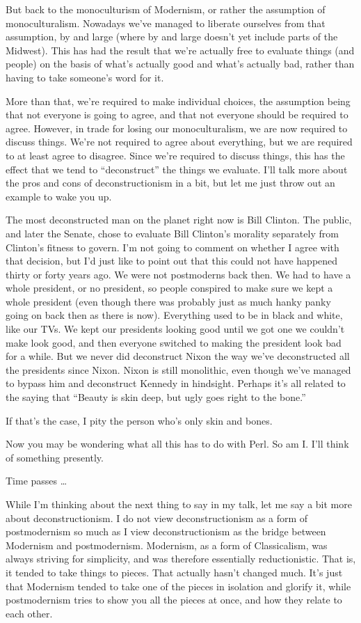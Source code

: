\documentclass[10pt,letterpaper]{article}
\begin{document}
But back to the monoculturism of Modernism, or rather the assumption of
monoculturalism. Nowadays we've managed to liberate ourselves from that
assumption, by and large (where by and large doesn't yet include parts of the
Midwest). This has had the result that we're actually free to evaluate things
(and people) on the basis of what's actually good and what's actually bad,
rather than having to take someone's word for it.

More than that, we're required to make individual choices, the assumption
being that not everyone is going to agree, and that not everyone should be
required to agree. However, in trade for losing our monoculturalism, we are
now required to discuss things. We're not required to agree about everything,
but we are required to at least agree to disagree. Since we're required to
discuss things, this has the effect that we tend to ``deconstruct'' the
things we evaluate. I'll talk more about the pros and cons of
deconstructionism in a bit, but let me just throw out an example to wake you
up.

The most deconstructed man on the planet right now is Bill Clinton. The
public, and later the Senate, chose to evaluate Bill Clinton's morality
separately from Clinton's fitness to govern. I'm not going to comment on
whether I agree with that decision, but I'd just like to point out that this
could not have happened thirty or forty years ago. We were not postmoderns
back then. We had to have a whole president, or no president, so 
people conspired to make sure we kept a whole president (even though there
was probably just as much hanky panky going on back then as there is now).
Everything used to be in black and white, like our TVs. We kept our
presidents looking good until we got one we couldn't make look good, and then
everyone switched to making the president look bad for a while. But we never
did deconstruct Nixon the way we've deconstructed all the presidents since
Nixon. Nixon is still monolithic, even though we've managed to bypass him and
deconstruct Kennedy in hindsight.  Perhaps it's all related to the saying
that ``Beauty is skin deep, but ugly goes right to the bone.''

If that's the case, I pity the person who's only skin and bones.

Now you may be wondering what all this has to do with Perl. So am I\hbox{}. I'll
think of something presently.

Time passes \ldots

While I'm thinking about the next thing to say in my talk, let me say a bit
more about deconstructionism. I do not view deconstructionism as a form of
postmodernism so much as I view deconstructionism as the bridge between
Modernism and postmodernism. Modernism, as a form of Classicalism, was always
striving for simplicity, and was therefore essentially reductionistic. That
is, it tended to take things to pieces. That actually hasn't changed much.
It's just that Modernism tended to take one of the pieces in isolation and
glorify it, while postmodernism tries to show you all the pieces at once, and
how they relate to each other.
\end{document}
